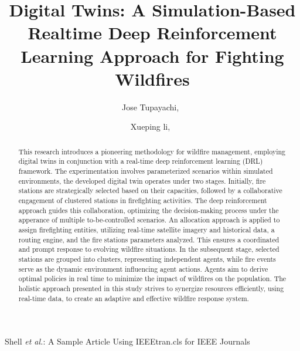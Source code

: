 \documentclass[lettersize,journal]{IEEEtran}
\begin{document}
\title{Digital Twins: A Simulation-Based Realtime Deep Reinforcement Learning Approach for Fighting Wildfires}
\author{%
    Jose Tupayachi,~
    \and
    Xueping li,~
}
%
{Shell \MakeLowercase{\textit{et al.}}: A Sample Article Using IEEEtran.cls for IEEE Journals}



\maketitle



\begin{abstract}
  This research introduces a pioneering methodology for wildfire management, employing digital twins in conjunction with a real-time deep reinforcement learning (DRL) framework. The experimentation involves parameterized scenarios within simulated environments, the developed digital twin operates under two stages. Initially, fire stations are strategically selected based on their capacities, followed by a collaborative engagement of clustered stations in firefighting activities. The deep reinforcement approach guides this collaboration, optimizing the decision-making process under the apperance of multiple to-be-controlled scenarios. An allocation approach is applied to assign firefighting entities, utilizing real-time satellite imagery and historical data, a routing engine, and the fire stations parameters analyzed. This ensures a coordinated and prompt response to evolving wildfire situations. In the subsequent stage, selected stations are grouped into clusters, representing independent agents, while fire events serve as the dynamic environment influencing agent actions. Agents aim to derive optimal policies in real time to minimize the impact of wildfires on the population. The holistic approach presented in this study strives to synergize resources efficiently, using real-time data, to create an adaptive and effective wildfire response system.

\end{abstract}
\end{document}
